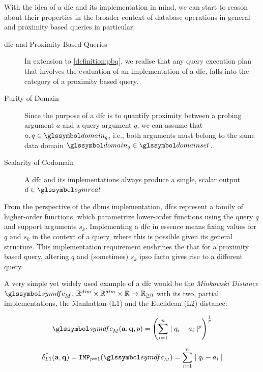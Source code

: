 With the idea of a \acrshort{dfc} and its implementation in mind, we can start to reason about their properties in the broader context of database operations in general and proximity based queries in particular:

\begin{description}
    \item[\acrshort{dfc} and Proximity Based Queries] In extension to \cref{definition:pbq}, we realise that any query execution plan that involves the evaluation of an implementation of a \acrshort{dfc}, falls into the category of a proximity based query.

    \item[Purity of Domain] Since the purpose of a \acrshort{dfc} is to quantify proximity between a probing argument $a$ and a query argument $q$, we can assume that $a, q \in \domain_q$, i.e., both arguments must belong to the same data domain $\domain_q \in \domainset$.

    \item[Scalarity of Codomain] A \acrshort{dfc} and its implementations always produce a single, scalar output $d \in \symreal$. 
\end{description}

From the perspective of the \acrshort{dbms} implementation, \acrshort{dfc}s represent a family of higher-order functions, which parametrize lower-order functions using the query $q$ and support arguments $s_k$. Implementing a \acrshort{dfc} in essence means fixing values for $q$ and $s_k$ in the context of a query, where this is possible given its general structure. This implementation requirement enshrines the that for a proximity based query, altering $q$ and (sometimes) $s_k$ ipso facto gives rise to a different query. 

A very simple yet widely used example of a \acrshort{dfc} would be the \emph{Minkowski Distance} $\symdfc_{M} \colon \mathbb{R}^{dim} \times \mathbb{R}^{dim} \times \mathbb{R} \to \mathbb{R}_{\geq 0}$ with its two, partial implementations, the Manhattan (L1) and the Euclidean (L2) distance:

\begin{equation}
    \symdfc_{M}(\mathbf{a},\mathbf{q},p) = \left(\sum_{i=1}^{n} \mid q_i - a_i \mid^p\right)^{\frac{1}{p}}
\end{equation}

\begin{equation}
    \hat{\delta_{L1}}(\mathbf{a},\mathbf{q}) = \texttt{IMP}_{p=1}(\symdfc_M) = \sum_{i=1}^{n} \mid q_i - a_i \mid
\end{equation}

